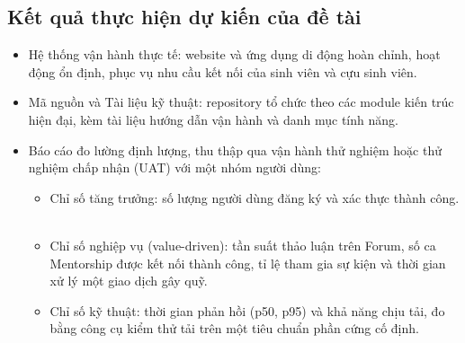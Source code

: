 \documentclass[12pt,a4paper]{article}
\begin{document}
\subsection{Kết quả thực hiện dự kiến của đề tài}
\vspace{-4pt}
\begin{itemize}
    \item Hệ thống vận hành thực tế: website và ứng dụng di động hoàn chỉnh, hoạt động ổn định, phục vụ nhu cầu kết nối của sinh viên và cựu sinh viên.
    \item Mã nguồn và Tài liệu kỹ thuật: repository tổ chức theo các module kiến trúc hiện đại, kèm tài liệu hướng dẫn vận hành và danh mục tính năng.
    \item Báo cáo đo lường định lượng, thu thập qua vận hành thử nghiệm hoặc thử nghiệm chấp nhận (UAT) với một nhóm người dùng:
    \begin{itemize}
        \item Chỉ số tăng trưởng: số lượng người dùng đăng ký và xác thực thành công.
        \item Chỉ số nghiệp vụ (value-driven): tần suất thảo luận trên Forum, số ca Mentorship được kết nối thành công, tỉ lệ tham gia sự kiện và thời gian xử lý một giao dịch gây quỹ.
        \item Chỉ số kỹ thuật: thời gian phản hồi (p50, p95) và khả năng chịu tải, đo bằng công cụ kiểm thử tải trên một tiêu chuẩn phần cứng cố định.
    \end{itemize}
\end{itemize}

\end{document}
